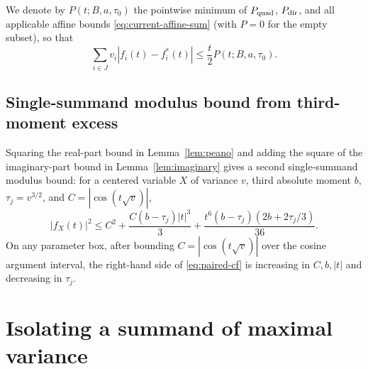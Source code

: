 \documentclass[11pt]{article}
\numberwithin{equation}{section}
\theoremstyle{remark}
\begin{document}
We denote by $P(t;B,a,\tau_0)$ the pointwise minimum of $P_{\rm quad}$,
$P_{\rm dir}$, and all applicable affine bounds \eqref{eq:current-affine-sum}
(with $P=0$ for the empty subset), so that
\[
 \sum_{i\in J} v_i|f_i(t)-f_i^*(t)|\le \frac t2P(t;B,a,\tau_0).
\]

\subsection{Single-summand modulus bound from third-moment excess}

Squaring the real-part bound in Lemma~\ref{lem:peano} and adding the square
of the imaginary-part bound in Lemma~\ref{lem:imaginary} gives a second
single-summand modulus bound: for a centered variable $X$ of variance $v$,
third absolute moment $b$, $\tau_j=v^{3/2}$, and $C=|\cos(t\sqrt v)|$,
\begin{equation}\label{eq:paired-cf}
 |f_X(t)|^2\le C^2+\frac{C(b-\tau_j)|t|^3}{3}
       +\frac{t^6(b-\tau_j)(2b+2\tau_j/3)}{36}.
\end{equation}
On any parameter box, after bounding $C=|\cos(t\sqrt v)|$ over the cosine
argument interval, the right-hand side of \eqref{eq:paired-cf} is increasing
in $C,b,|t|$ and decreasing in $\tau_j$.

\section{Isolating a summand of maximal variance}\label{sec:distinguished}
\end{document}
